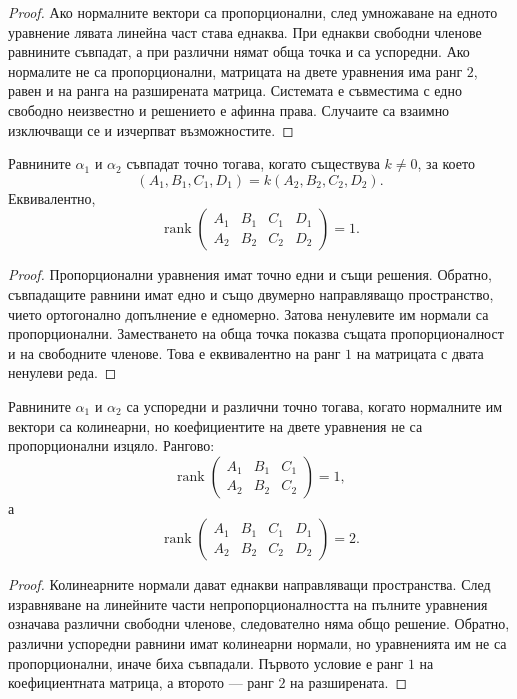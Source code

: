 \begin{proof}
Ако нормалните вектори са пропорционални, след умножаване на едното уравнение лявата линейна част става еднаква. При еднакви свободни членове равнините съвпадат, а при различни нямат обща точка и са успоредни. Ако нормалите не са пропорционални, матрицата на двете уравнения има ранг $2$, равен и на ранга на разширената матрица. Системата е съвместима с едно свободно неизвестно и решението е афинна права. Случаите са взаимно изключващи се и изчерпват възможностите.
\end{proof}

\begin{prop}
Равнините $\alpha_1$ и $\alpha_2$ съвпадат точно тогава, когато съществува $k\ne0$, за което
\[
(A_1,B_1,C_1,D_1)=k(A_2,B_2,C_2,D_2).
\]
Еквивалентно,
\[
\operatorname{rank}
\begin{pmatrix}
A_1&B_1&C_1&D_1\\
A_2&B_2&C_2&D_2
\end{pmatrix}=1.
\]
\end{prop}

\begin{proof}
Пропорционални уравнения имат точно едни и същи решения. Обратно, съвпадащите равнини имат едно и също двумерно направляващо пространство, чието ортогонално допълнение е едномерно. Затова ненулевите им нормали са пропорционални. Заместването на обща точка показва същата пропорционалност и на свободните членове. Това е еквивалентно на ранг $1$ на матрицата с двата ненулеви реда.
\end{proof}

\begin{prop}
Равнините $\alpha_1$ и $\alpha_2$ са успоредни и различни точно тогава, когато нормалните им вектори са колинеарни, но коефициентите на двете уравнения не са пропорционални изцяло. Рангово:
\[
\operatorname{rank}
\begin{pmatrix}
A_1&B_1&C_1\\
A_2&B_2&C_2
\end{pmatrix}=1,
\]
а
\[
\operatorname{rank}
\begin{pmatrix}
A_1&B_1&C_1&D_1\\
A_2&B_2&C_2&D_2
\end{pmatrix}=2.
\]
\end{prop}

\begin{proof}
Колинеарните нормали дават еднакви направляващи пространства. След изравняване на линейните части непропорционалността на пълните уравнения означава различни свободни членове, следователно няма общо решение. Обратно, различни успоредни равнини имат колинеарни нормали, но уравненията им не са пропорционални, иначе биха съвпадали. Първото условие е ранг $1$ на коефициентната матрица, а второто --- ранг $2$ на разширената.
\end{proof}

